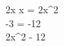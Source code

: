 \documentclass[preview]{standalone}
\begin{document}
\begin{center}
2x \times x = 2x^2 \\ -3  = -12 \\  2x^2 - 12
\end{center}
\end{document}
